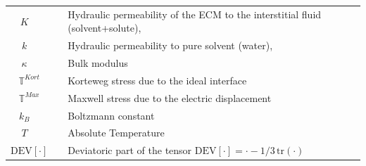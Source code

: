 \documentclass[runningheads]{llncs}
\newcommand{\F}{\ensuremath{\mathbb{F}}}
\begin{document}
\begin{table}[h!]
\begin{tabular}{c  l}
	$K\qquad$ &  Hydraulic permeability of the ECM to the interstitial fluid (solvent+solute),\\
	$k\qquad$ &  Hydraulic  permeability  to  pure  solvent (water),\\
	$\kappa\qquad$ & Bulk modulus\\
	$\mathbb{T}^{Kort}\quad$ & Korteweg stress due to the ideal interface\\
	$\mathbb{T}^{Max}\quad$ & Maxwell stress due to the electric displacement\\
	$k_B\qquad$ & Boltzmann constant\\
	$T\qquad$ & Absolute Temperature \\
	$\text{DEV}\left[\cdot\right]\quad$ & Deviatoric part of the tensor $\text{DEV}\left[\cdot\right] = \cdot-1/3\, \text{tr}(\cdot)$
\end{tabular}	
\end{table}
\end{document}
